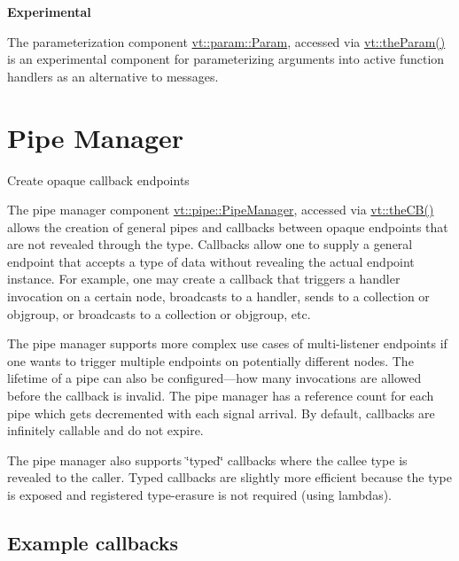  {\bfseries Experimental}

The parameterization component {\ttfamily \hyperlink{structvt_1_1param_1_1_param}{vt\+::param\+::\+Param}}, accessed via {\ttfamily \hyperlink{namespacevt_a268431014c9031c0f7c33d32c1b8645c}{vt\+::the\+Param()}} is an experimental component for parameterizing arguments into active function handlers as an alternative to messages. \hypertarget{pipe}{}\section{Pipe Manager}\label{pipe}
Create opaque callback endpoints

The pipe manager component {\ttfamily \hyperlink{structvt_1_1pipe_1_1_pipe_manager}{vt\+::pipe\+::\+Pipe\+Manager}}, accessed via {\ttfamily \hyperlink{namespacevt_a673b109e94c7bca58313504c83e1da94}{vt\+::the\+C\+B()}} allows the creation of general pipes and callbacks between opaque endpoints that are not revealed through the type. Callbacks allow one to supply a general endpoint that accepts a type of data without revealing the actual endpoint instance. For example, one may create a callback that triggers a handler invocation on a certain node, broadcasts to a handler, sends to a collection or objgroup, or broadcasts to a collection or objgroup, etc.

The pipe manager supports more complex use cases of multi-\/listener endpoints if one wants to trigger multiple endpoints on potentially different nodes. The lifetime of a pipe can also be configured---how many invocations are allowed before the callback is invalid. The pipe manager has a reference count for each pipe which gets decremented with each signal arrival. By default, callbacks are infinitely callable and do not expire.

The pipe manager also supports \char`\"{}typed\char`\"{} callbacks where the callee type is revealed to the caller. Typed callbacks are slightly more efficient because the type is exposed and registered type-\/erasure is not required (using lambdas).\hypertarget{pipe_callback-example}{}\subsection{Example callbacks}\label{pipe_callback-example}

